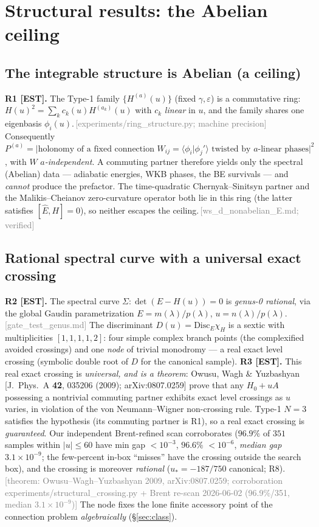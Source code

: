 \documentclass[aps,prd,reprint,nofootinbib]{revtex4-2}
\newcommand{\pnote}[1]{\textcolor{gray}{\footnotesize\,[#1]}}
\newcommand{\eps}{\varepsilon}
\begin{document}
\section{Structural results: the Abelian ceiling}\label{sec:ceiling}

\subsection{The integrable structure is Abelian (a ceiling)}
\textbf{R1 [EST].} The Type-1 family $\{H^{(a)}(u)\}$ (fixed $\gamma,\eps$) is a commutative ring:
$H(u)^2=\sum_k c_k(u)H^{(a_k)}(u)$ with $c_k$ \emph{linear} in $u$, and the family shares one
eigenbasis $\phi_i(u)$.\pnote{experiments/ring\_structure.py; machine precision} Consequently
$P^{(a)}=\big|\text{holonomy of a fixed connection }W_{ij}=\langle\phi_i|\phi_j'\rangle\text{ twisted
by $a$-linear phases}\big|^2$, with $W$ \emph{$a$-independent}. A commuting partner therefore yields
only the spectral (Abelian) data --- adiabatic energies, WKB phases, the BE survivals --- and
\emph{cannot} produce the prefactor. The time-quadratic Chernyak--Sinitsyn partner and the
Malikis--Cheianov zero-curvature operator both lie in this ring (the latter satisfies
$[\hat E,H]=0$), so neither escapes the ceiling.\pnote{ws\_d\_nonabelian\_E.md; verified}

\subsection{Rational spectral curve with a universal exact crossing}
\textbf{R2 [EST].} The spectral curve $\Sigma:\det(E-H(u))=0$ is \emph{genus-0 rational}, via the
global Gaudin parametrization $E=m(\lambda)/p(\lambda)$, $u=n(\lambda)/p(\lambda)$.\pnote{gate\_test\_genus.md}
The discriminant $D(u)=\mathrm{Disc}_E\chi_H$ is a sextic with multiplicities $[1,1,1,1,2]$: four
simple complex branch points (the complexified avoided crossings) and one \emph{node} of trivial
monodromy --- a real exact level crossing (symbolic double root of $D$ for the canonical sample).
\textbf{R3 [EST].} This real exact crossing is \emph{universal, and is a theorem}: Owusu, Wagh
\& Yuzbashyan [J.~Phys.~A \textbf{42}, 035206 (2009); arXiv:0807.0259] prove that any
$H_0+uA$ possessing a nontrivial commuting partner exhibits exact level crossings as $u$ varies,
in violation of the von Neumann--Wigner non-crossing rule. Type-1 $N{=}3$ satisfies the hypothesis
(its commuting partner is R1), so a real exact crossing is \emph{guaranteed}. Our independent
Brent-refined scan corroborates ($96.9\%$ of $351$ samples within $|u|\le60$ have min gap
$<10^{-3}$, $96.6\%$ $<10^{-6}$, \emph{median gap} $3.1\times10^{-9}$; the few-percent in-box
``misses'' have the crossing outside the search box), and the crossing is moreover \emph{rational}
($u_*=-187/750$ canonical; R8).\pnote{theorem: Owusu--Wagh--Yuzbashyan 2009, arXiv:0807.0259;
corroboration experiments/structural\_crossing.py + Brent re-scan 2026-06-02 (96.9\%/351, median
$3.1\!\times\!10^{-9}$)} The node fixes the lone
finite accessory point of the connection problem \emph{algebraically} (\S\ref{sec:class}).
\end{document}
